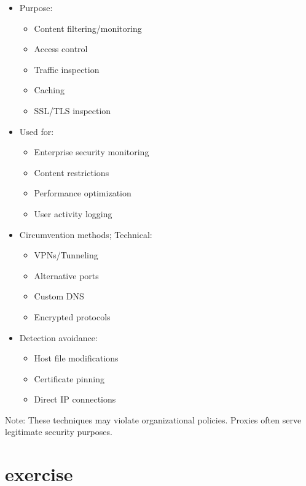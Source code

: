 \begin{itemize}
  \item Purpose:
  \begin{itemize}
    \tightlist
		\item Content filtering/monitoring
		\item Access control
		\item Traffic inspection
		\item Caching
		\item SSL/TLS inspection
  \end{itemize}

  \item Used for:
  \begin{itemize}
    \tightlist
		\item Enterprise security monitoring
		\item Content restrictions
		\item Performance optimization
		\item User activity logging
  \end{itemize}

  \item Circumvention methods; Technical:
  \begin{itemize}
    \tightlist
		\item VPNs/Tunneling
		\item Alternative ports
		\item Custom DNS
		\item Encrypted protocols
  \end{itemize}

	\item Detection avoidance:
  \begin{itemize}
    \tightlist
		\item Host file modifications
		\item Certificate pinning
		\item Direct IP connections
  \end{itemize}
\end{itemize}

Note: These techniques may violate organizational policies. Proxies often serve legitimate security purposes.
%
\section{exercise}